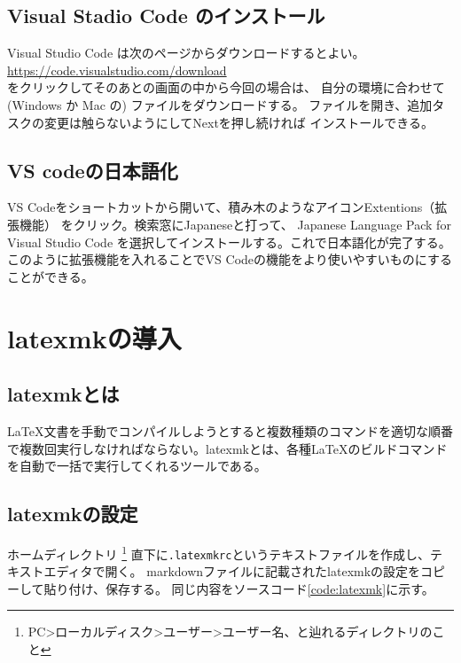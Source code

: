 \documentclass[titlepage]{ltjsarticle}
\begin{document}
\subsection{Visual Stadio Code のインストール}
Visual Studio Code は次のページからダウンロードするとよい。\\
\url{https://code.visualstudio.com/download}\\
をクリックしてそのあとの画面の中から今回の場合は、
自分の環境に合わせて (Windows か Mac の) ファイルをダウンロードする。
ファイルを開き、追加タスクの変更は触らないようにしてNextを押し続ければ
インストールできる。
\subsection{VS codeの日本語化}
VS Codeをショートカットから開いて、積み木のようなアイコンExtentions（拡張機能）
をクリック。検索窓にJapaneseと打って、
Japanese Language Pack for Visual Studio Code
を選択してインストールする。これで日本語化が完了する。
このように拡張機能を入れることでVS Codeの機能をより使いやすいものにすることができる。

\section{latexmkの導入} 
\subsection{latexmkとは}
\LaTeX 文書を手動でコンパイルしようとすると複数種類のコマンドを適切な順番で複数回実行しなければならない。latexmkとは、各種\LaTeX のビルドコマンドを自動で一括で実行してくれるツールである。

\subsection{latexmkの設定}
ホームディレクトリ
\footnote{
  PC>ローカルディスク>ユーザー>ユーザー名、と辿れるディレクトリのこと
}
直下に\verb|.latexmkrc|というテキストファイルを作成し、テキストエディタで開く。
markdownファイルに記載されたlatexmkの設定をコピーして貼り付け、保存する。
同じ内容をソースコード\ref{code:latexmk}に示す。
\end{document}
